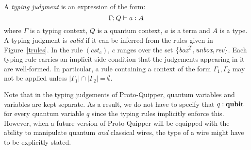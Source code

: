 \documentclass[twoside]{article}
\begin{document}
\begin{definition}
A \emph{typing judgment} is an expression of the form:
\[
\Gamma ; Q \vdash a:A
\] 
where $\Gamma$ is a typing context, $Q$ is a quantum context, 
$a$ is a term and $A$ is a type. A typing judgment is \emph{valid} if 
it can be inferred from the rules given in Figure~\hyperref[trules]{\ref*{trules}}. In the rule $(cst_c)$, 
$c$ ranges over the set $\{\mathop{\textit{box}}\nolimits^T, \mathop{\textit{unbox}}\nolimits, \mathop{\textit{rev}}\nolimits\}$. Each typing rule
carries an implicit side condition that the judgements appearing in it
are well-formed. In particular, a rule containing a context of the form
$\Gamma_1,\Gamma_2$ may not be applied unless
$|\Gamma_1|\cap|\Gamma_2|=\emptyset$. 
\end{definition}

Note that in the typing judgements of Proto-Quipper, quantum variables
and variables are kept separate. As a result, we do not have to specify
that $q:\textrm{\bf qubit}$ for every quantum variable $q$ since the typing rules
implicitly enforce this. However, when a future version of
Proto-Quipper will be equipped with the ability to manipulate quantum
\emph{and} classical wires, the type of a wire might have to be
explicitly stated.

\end{document}
